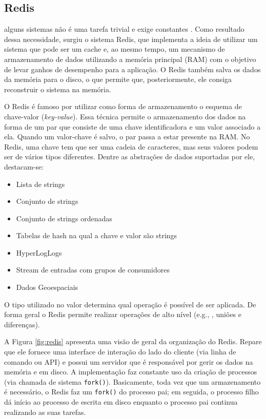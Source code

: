 \subsection{Redis}

 alguns sistemas não é uma tarefa trivial e exige constantes
. Como resultado dessa necessidade, surgiu o sistema Redis, que
implementa a ideia de utilizar um sistema que pode ser um cache e, ao mesmo tempo,
um mecanismo de armazenamento de dados utilizando a memória principal (RAM) com o objetivo
de levar ganhos de desempenho para a aplicação. O Redis também salva os dados
da memória para o disco, o que permite que, posteriormente, ele consiga
reconstruir o sistema na memória.

O Redis é famoso por utilizar como forma de armazenamento o esquema de
chave-valor (\textit{key-value}). Essa técnica permite o armazenamento dos dados na
forma de um par que consiste de uma chave identificadora e um valor associado a
ela. Quando um valor-chave é salvo, o par passa a estar presente na
RAM. No Redis, uma chave tem que ser uma cadeia de caracteres, mas seus valores podem ser de
vários tipos diferentes. Dentre as abstrações de dados suportadas por ele, destacam-se:

\begin{itemize}
  \item Lista de strings
  \item Conjunto de strings
  \item Conjunto de strings ordenadas
  \item Tabelas de hash na qual a chave e valor são strings
  \item HyperLogLogs
  \item Stream de entradas com grupos de consumidores
  \item Dados Geoespaciais
\end{itemize}

O tipo utilizado no valor determina qual operação é possível de ser aplicada.
De forma geral o Redis permite realizar operações de alto nível (e.g.,
, uniões e diferenças).

A Figura \ref{fig:redis} apresenta uma visão de geral da organização do Redis.
Repare que ele fornece uma interface de interação do lado do cliente (via
linha de comando ou API) e possui um servidor que é responsável por gerir os dados na memória e em disco.
A implementação faz constante uso da criação de processos (via
chamada de sistema \texttt{fork()}). Basicamente, toda vez que um armazenamento
é necessário, o Redis faz um \texttt{fork()} do processo pai; em seguida, o
processo filho dá início ao processo de escrita em disco enquanto o processo
pai continua realizando as suas tarefas. 

